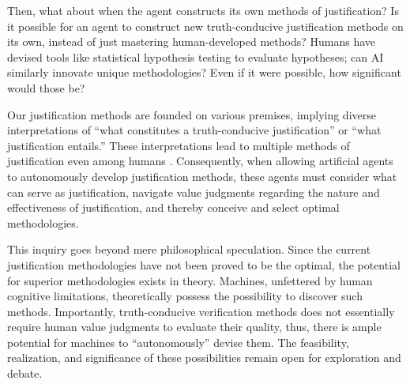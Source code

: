 Then, what about when the agent constructs its own methods of justification? Is it possible for an agent to construct new truth-conducive justification methods on its own, instead of just mastering human-developed methods? Humans have devised tools like statistical hypothesis testing to evaluate hypotheses; can AI similarly innovate unique methodologies? Even if it were possible, how significant would those be?

Our justification methods are founded on various premises, implying diverse interpretations of ``what constitutes a truth-conducive justification'' or ``what justification entails.'' These interpretations lead to multiple methods of justification even among humans \cite{otsuka2022thinking}. Consequently, when allowing artificial agents to autonomously develop justification methods, these agents must consider what can serve as justification, navigate value judgments regarding the nature and effectiveness of justification, and thereby conceive and select optimal methodologies.

This inquiry goes beyond mere philosophical speculation. Since the current justification methodologies have not been proved to be the optimal, the potential for superior methodologies exists in theory. Machines, unfettered by human cognitive limitations, theoretically possess the possibility to discover such methods. Importantly, truth-conducive verification methods does not essentially require human value judgments to evaluate their quality, thus, there is ample potential for machines to ``autonomously'' devise them. The feasibility, realization, and significance of these possibilities remain open for exploration and debate.




